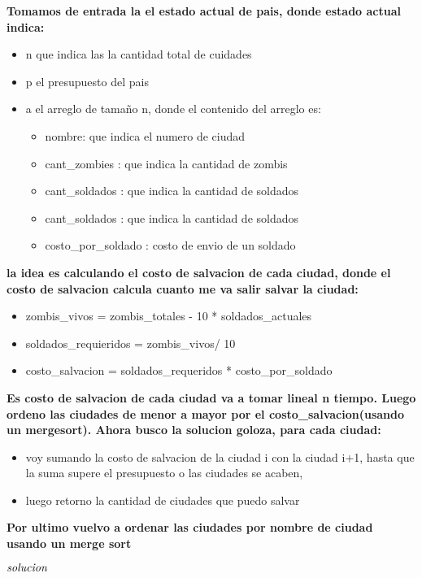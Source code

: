 \textbf{
Tomamos de entrada la el estado actual de pais, donde estado actual indica:
}
\begin{itemize}
   \item  n que indica las la cantidad total de cuidades 
   \item p el presupuesto del pais  
   \item a el arreglo de tamaño n, donde el contenido del arreglo es:
   \begin{itemize}
		\item nombre: que indica el numero de ciudad
		\item cant_zombies : que indica la cantidad de zombis
		\item cant_soldados : que indica la cantidad de soldados
		\item cant_soldados : que indica la cantidad de soldados
		\item costo_por_soldado : costo de envio de un soldado
   \end{itemize}  
\end{itemize}
\textbf{
la idea es calculando el costo de salvacion de cada ciudad, donde el costo de salvacion calcula 
cuanto me va salir salvar la ciudad:   
}
\begin{itemize}
   \item  zombis_vivos = zombis_totales - 10 * soldados_actuales
   \item  soldados_requieridos = zombis_vivos/ 10
   \item costo_salvacion = soldados_requeridos * costo_por_soldado  
\end{itemize}
\textbf{
Es costo de salvacion de cada ciudad va a tomar lineal n tiempo. Luego ordeno las ciudades de menor a mayor
por el costo_salvacion(usando un mergesort). Ahora busco la solucion goloza, para cada ciudad:
}
\begin{itemize}
	\item voy sumando la costo de salvacion de la ciudad i con la ciudad i+1, hasta que la suma 
	supere el presupuesto o las ciudades se acaben, 
	\item luego retorno la cantidad de ciudades que puedo salvar
\end{itemize}
\textbf{
Por ultimo vuelvo a ordenar las ciudades por nombre de ciudad usando un merge sort 
}

\begin{codebox}
\li \Return $\id{solucion}$
\end{codebox}



